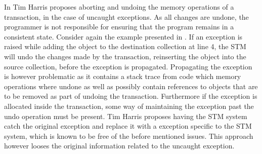 In \cite{harris2005exceptions} Tim Harris proposes aborting and undoing the memory operations of a transaction, in the case of uncaught exceptions. As all changes are undone, the programmer is not responsible for ensuring that the program remains in a consistent state\cite[p.3]{harris2005exceptions}\cite[p. 80]{harris2010transactional}. Consider again the example presented in . If an exception is raised while adding the object to the destination collection at line 4, the \ac{STM} will undo the changes made by the transaction, reinserting the object into the source collection, before the exception is propagated. Propagating the exception is however problematic as it contains a stack trace from code which memory operations where undone as well as possibly contain references to objects that are to be removed as part of undoing the transaction. Furthermore if the exception is allocated inside the transaction, some way of maintaining the exception past the undo operation must be present. Tim Harris proposes having the \ac{STM} system catch the original exception and replace it with a exception specific to the \ac{STM} system, which is known to be free of the before mentioned issues\cite[p. 3]{harris2005exceptions}. This approach however looses the original information related to the uncaught exception.


